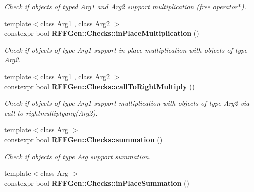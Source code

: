 \begin{DoxyCompactItemize}
\begin{DoxyCompactList}\small\item\em Check if objects of typed Arg1 and Arg2 support multiplication (free operator$\ast$). \end{DoxyCompactList}\item 
\hypertarget{namespaceRFFGen_1_1Checks_ab0dbf2f7d2c61783e3d9238f19bf4a1d}{{\footnotesize template$<$class Arg1 , class Arg2 $>$ }\\constexpr bool {\bfseries R\-F\-F\-Gen\-::\-Checks\-::in\-Place\-Multiplication} ()}\label{namespaceRFFGen_1_1Checks_ab0dbf2f7d2c61783e3d9238f19bf4a1d}

\begin{DoxyCompactList}\small\item\em Check if objects of type Arg1 support in-\/place multiplication with objects of type Arg2. \end{DoxyCompactList}\item 
\hypertarget{namespaceRFFGen_1_1Checks_a378f4e2b01c0a0633f7574c3cc7652af}{{\footnotesize template$<$class Arg1 , class Arg2 $>$ }\\constexpr bool {\bfseries R\-F\-F\-Gen\-::\-Checks\-::call\-To\-Right\-Multiply} ()}\label{namespaceRFFGen_1_1Checks_a378f4e2b01c0a0633f7574c3cc7652af}

\begin{DoxyCompactList}\small\item\em Check if objects of type Arg1 support multiplication with objects of type Arg2 via call to rightmultiplyany(\-Arg2). \end{DoxyCompactList}\item 
\hypertarget{namespaceRFFGen_1_1Checks_a9132707e043afacd59b699d72941fbf4}{{\footnotesize template$<$class Arg $>$ }\\constexpr bool {\bfseries R\-F\-F\-Gen\-::\-Checks\-::summation} ()}\label{namespaceRFFGen_1_1Checks_a9132707e043afacd59b699d72941fbf4}

\begin{DoxyCompactList}\small\item\em Check if objects of type Arg support summation. \end{DoxyCompactList}\item 
\hypertarget{namespaceRFFGen_1_1Checks_a5c4e05c6d72041a77027e6f9eac3e7ba}{{\footnotesize template$<$class Arg $>$ }\\constexpr bool {\bfseries R\-F\-F\-Gen\-::\-Checks\-::in\-Place\-Summation} ()}\label{namespaceRFFGen_1_1Checks_a5c4e05c6d72041a77027e6f9eac3e7ba}


\end{DoxyCompactItemize}
